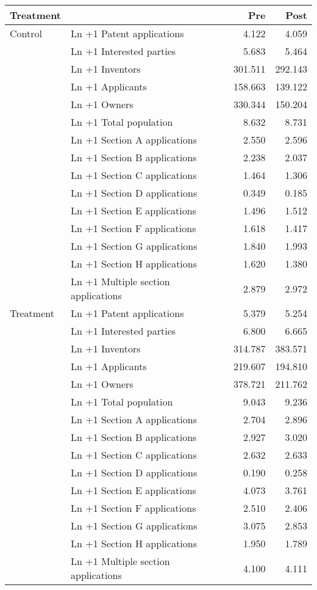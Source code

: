 
\begin{tabular}[t]{llrr}
\toprule
Treatment &   & Pre & Post\\
\midrule
Control & Ln +1 Patent applications & \num{4.122} & \num{4.059}\\
 & Ln +1 Interested parties & \num{5.683} & \num{5.464}\\
 & Ln +1 Inventors & \num{301.511} & \num{292.143}\\
 & Ln +1 Applicants & \num{158.663} & \num{139.122}\\
 & Ln +1 Owners & \num{330.344} & \num{150.204}\\
 & Ln +1 Total population & \num{8.632} & \num{8.731}\\
 & Ln +1 Section A applications & \num{2.550} & \num{2.596}\\
 & Ln +1 Section B applications & \num{2.238} & \num{2.037}\\
 & Ln +1 Section C applications & \num{1.464} & \num{1.306}\\
 & Ln +1 Section D applications & \num{0.349} & \num{0.185}\\
 & Ln +1 Section E applications & \num{1.496} & \num{1.512}\\
 & Ln +1 Section F applications & \num{1.618} & \num{1.417}\\
 & Ln +1 Section G applications & \num{1.840} & \num{1.993}\\
 & Ln +1 Section H applications & \num{1.620} & \num{1.380}\\
 & Ln +1 Multiple section applications & \num{2.879} & \num{2.972}\\
Treatment & Ln +1 Patent applications & \num{5.379} & \num{5.254}\\
 & Ln +1 Interested parties & \num{6.800} & \num{6.665}\\
 & Ln +1 Inventors & \num{314.787} & \num{383.571}\\
 & Ln +1 Applicants & \num{219.607} & \num{194.810}\\
 & Ln +1 Owners & \num{378.721} & \num{211.762}\\
 & Ln +1 Total population & \num{9.043} & \num{9.236}\\
 & Ln +1 Section A applications & \num{2.704} & \num{2.896}\\
 & Ln +1 Section B applications & \num{2.927} & \num{3.020}\\
 & Ln +1 Section C applications & \num{2.632} & \num{2.633}\\
 & Ln +1 Section D applications & \num{0.190} & \num{0.258}\\
 & Ln +1 Section E applications & \num{4.073} & \num{3.761}\\
 & Ln +1 Section F applications & \num{2.510} & \num{2.406}\\
 & Ln +1 Section G applications & \num{3.075} & \num{2.853}\\
 & Ln +1 Section H applications & \num{1.950} & \num{1.789}\\
 & Ln +1 Multiple section applications & \num{4.100} & \num{4.111}\\
\bottomrule
\end{tabular}
